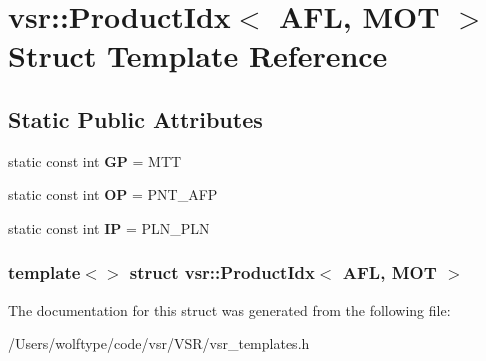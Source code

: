 \hypertarget{structvsr_1_1_product_idx_3_01_a_f_l_00_01_m_o_t_01_4}{\section{vsr\-:\-:Product\-Idx$<$ A\-F\-L, M\-O\-T $>$ Struct Template Reference}
\label{structvsr_1_1_product_idx_3_01_a_f_l_00_01_m_o_t_01_4}
}
\subsection*{Static Public Attributes}
\begin{DoxyCompactItemize}
\item 
\hypertarget{structvsr_1_1_product_idx_3_01_a_f_l_00_01_m_o_t_01_4_acb2cbdb4faad7f8ed16ac8adcf8b2304}{static const int {\bfseries G\-P} = M\-T\-T}\label{structvsr_1_1_product_idx_3_01_a_f_l_00_01_m_o_t_01_4_acb2cbdb4faad7f8ed16ac8adcf8b2304}

\item 
\hypertarget{structvsr_1_1_product_idx_3_01_a_f_l_00_01_m_o_t_01_4_aaff7a543b7aec8e4d2893e6112147b53}{static const int {\bfseries O\-P} = P\-N\-T\-\_\-\-A\-F\-P}\label{structvsr_1_1_product_idx_3_01_a_f_l_00_01_m_o_t_01_4_aaff7a543b7aec8e4d2893e6112147b53}

\item 
\hypertarget{structvsr_1_1_product_idx_3_01_a_f_l_00_01_m_o_t_01_4_adcad672f14a16f14a7c9ff775896830e}{static const int {\bfseries I\-P} = P\-L\-N\-\_\-\-P\-L\-N}\label{structvsr_1_1_product_idx_3_01_a_f_l_00_01_m_o_t_01_4_adcad672f14a16f14a7c9ff775896830e}

\end{DoxyCompactItemize}
\subsubsection*{template$<$$>$ struct vsr\-::\-Product\-Idx$<$ A\-F\-L, M\-O\-T $>$}



The documentation for this struct was generated from the following file\-:\begin{DoxyCompactItemize}
\item 
/\-Users/wolftype/code/vsr/\-V\-S\-R/vsr\-\_\-templates.\-h\end{DoxyCompactItemize}
